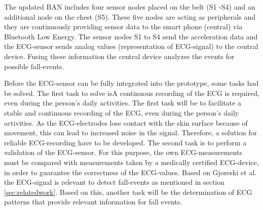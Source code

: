 \documentclass[review]{elsarticle}
\begin{document}
The updated BAN includes four sensor nodes placed on the belt (S1 -S4) and an additional node on the chest (S5). These five nodes are acting as peripherals and they are continuously providing sensor data to the smart phone (central) via Bluetooth Low Energy. The sensor nodes S1 to S4 send the acceleration data and the ECG-sensor sends analog values (representation of ECG-signal) to the central device. Fusing these information the central device analyzes the events for possible fall-events.

Before the ECG-sensor can be fully integrated into the prototype, some tasks had be solved.  The first task to solve isA continuous recording of the ECG is required, even during the person's daily activities. The first task will be to facilitate a stable and continuous recording of the ECG, even during the person's daily activities. As the ECG-electrodes lose contact with the skin surface because of movement, this can lead to increased noise in the signal. Therefore, a solution for reliable ECG-recording have to be developed. The second task is to perform a validation of the ECG-sensor. For this purpose, the own ECG-measurements must be compared with measurements taken by a medically certified ECG-device, in order to guarantee the correctness of the ECG-values. Based on Gjoreski et al. \cite{Gjoreski2014} the ECG-signal is relevant to detect fall-events as mentioned in section \ref{sec:relatedwork}. Based on this, another task will be the determination of ECG patterns that provide relevant information for fall events.
\end{document}
